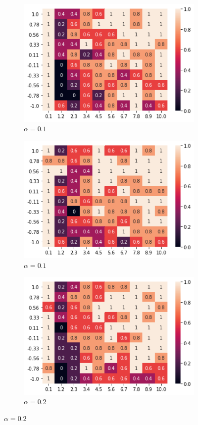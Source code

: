 \documentclass[.../main.tex]{subfiles}
\begin{document}
\begin{figure}[h]
	\centering
	\begin{subfigure}[b]{0.45 \textwidth}
	\centering
	\includegraphics[width = 0.7 \textwidth]{Figures/Run1.png}
	\caption{$\alpha = 0.1$}
	\end{subfigure}
	\begin{subfigure}[b]{0.45 \textwidth}
	\centering
	\includegraphics[width = 0.7 \textwidth]{Figures/Run2.png}
	\caption{$\alpha = 0.1$}
	\end{subfigure}
	\begin{subfigure}[b]{0.45 \textwidth}
	\centering
	\includegraphics[width = 0.7 \textwidth]{Figures/Alpha_2.png}
	\caption{$\alpha = 0.2$}

\end{subfigure}
\end{figure}
\end{document}
